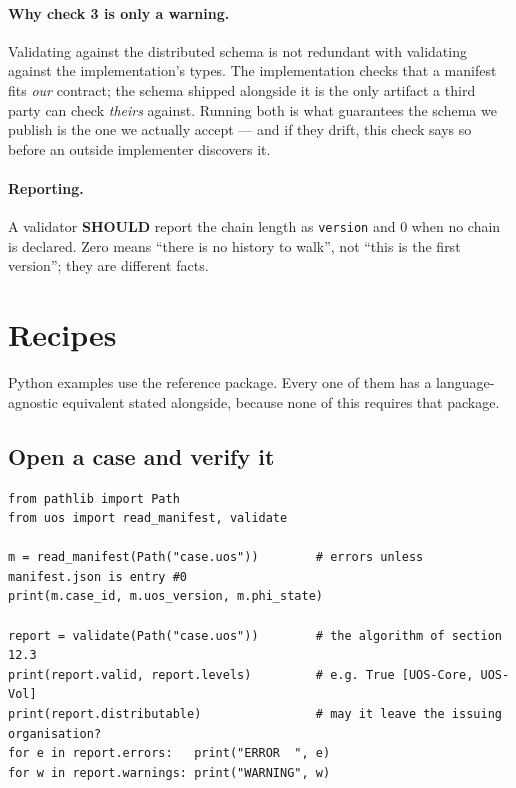\documentclass[11pt,a4paper]{article}
\newcommand{\SHOULD}{\textcolor{uosamber}{\textbf{SHOULD}}}
\newcommand{\code}[1]{\texttt{\small #1}}
\begin{document}
\paragraph{Why check 3 is only a warning.} Validating against the distributed schema is not
redundant with validating against the implementation's types. The implementation checks
that a manifest fits \emph{our} contract; the schema shipped alongside it is the only artifact a
third party can check \emph{theirs} against. Running both is what guarantees the schema we publish
is the one we actually accept --- and if they drift, this check says so before an outside
implementer discovers it.

\paragraph{Reporting.} A validator \SHOULD{} report the chain length as \code{version} and
0 when no chain is declared. Zero means ``there is no history to walk'', not ``this is the
first version''; they are different facts.

\section{Recipes}\label{sec:cookbook}

Python examples use the reference package. Every one of them has a language-agnostic
equivalent stated alongside, because none of this requires that package.

\subsection{Open a case and verify it}\label{rec:open}

\begin{lstlisting}[style=py]
from pathlib import Path
from uos import read_manifest, validate

m = read_manifest(Path("case.uos"))        # errors unless manifest.json is entry #0
print(m.case_id, m.uos_version, m.phi_state)

report = validate(Path("case.uos"))        # the algorithm of section 12.3
print(report.valid, report.levels)         # e.g. True [UOS-Core, UOS-Vol]
print(report.distributable)                # may it leave the issuing organisation?
for e in report.errors:   print("ERROR  ", e)
for w in report.warnings: print("WARNING", w)
\end{lstlisting}
\end{document}
